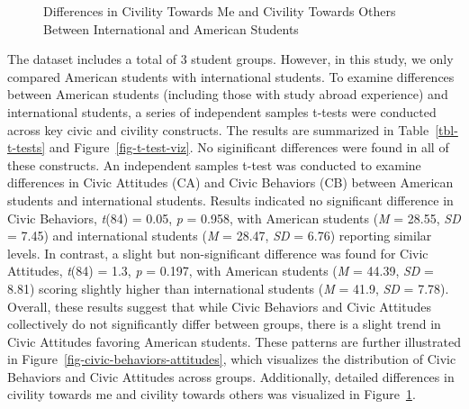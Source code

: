 \documentclass[
  man,
  floatsintext,
  longtable,
  nolmodern,
  notxfonts,
  notimes,
  colorlinks=true,linkcolor=blue,citecolor=blue,urlcolor=blue]{apa7}
\begin{document}
\begin{figure}

\caption{\label{fig-civility-me-others}Differences in Civility Towards
Me and Civility Towards Others Between International and American
Students}


\end{figure}%

The dataset includes a total of 3 student groups. However, in this
study, we only compared American students with international students.
To examine differences between American students (including those with
study abroad experience) and international students, a series of
independent samples t-tests were conducted across key civic and civility
constructs. The results are summarized in Table~\ref{tbl-t-tests} and
Figure~\ref{fig-t-test-viz}. No siginificant differences were found in
all of these constructs. An independent samples t-test was conducted to
examine differences in Civic Attitudes (CA) and Civic Behaviors (CB)
between American students and international students. Results indicated
no significant difference in Civic Behaviors, \emph{t}(84) = 0.05,
\emph{p} = 0.958, with American students (\emph{M} = 28.55, \emph{SD} =
7.45) and international students (\emph{M} = 28.47, \emph{SD} = 6.76)
reporting similar levels. In contrast, a slight but non-significant
difference was found for Civic Attitudes, \emph{t}(84) = 1.3, \emph{p} =
0.197, with American students (\emph{M} = 44.39, \emph{SD} = 8.81)
scoring slightly higher than international students (\emph{M} = 41.9,
\emph{SD} = 7.78). Overall, these results suggest that while Civic
Behaviors and Civic Attitudes collectively do not significantly differ
between groups, there is a slight trend in Civic Attitudes favoring
American students. These patterns are further illustrated in
Figure~\ref{fig-civic-behaviors-attitudes}, which visualizes the
distribution of Civic Behaviors and Civic Attitudes across groups.
Additionally, detailed differences in civility towards me and civility
towards others was visualized in Figure~\ref{fig-civility-me-others}.
\end{document}
